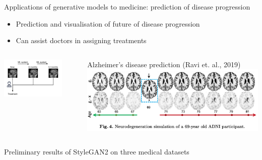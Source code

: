 \documentclass[8pt,xcolor=table,aspectratio=169]{beamer}
\begin{document}
\begin{frame}{Applications of generative models to medicine: prediction of disease progression}

\begin{itemize}
\item Prediction and visualisation of future of disease progression
\item Can assist doctors in assigning treatments
\end{itemize}
\vspace{2em}

\begin{columns}
\begin{column}{0.5\textwidth}
\centering
\includegraphics[width=0.8\textwidth]{disprog}
\end{column}
\begin{column}{0.5\textwidth}
\centering
Alzheimer's disease prediction (Ravi et. al., 2019)
\includegraphics[width=\textwidth]{JFP3eyw.png}
\end{column}
\end{columns}

\end{frame}

\begin{frame}[plain, c]

\begin{center}
\Huge Preliminary results of StyleGAN2 on three medical datasets
\end{center}

\end{frame}
\end{document}
